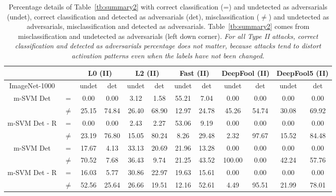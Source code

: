 \documentclass[10pt,twocolumn,letterpaper]{article}
\begin{document}
\begin{table*}[h]
\begin{center}
\resizebox{0.9\textwidth}{!}
{
\begin{tabular}{c | c |c c| c c|c c|c c| c c }
 & & \multicolumn{2}{c|}{L0 (II)} & \multicolumn{2}{c|}{L2 (II)} & \multicolumn{2}{c|}{Fast (II)} & \multicolumn{2}{c|}{DeepFool (II)} & \multicolumn{2}{c}{DeepFool5 (II)}\\
\hline
ImageNet-1000 & &   undet   &   det & undet   &   det  & undet   &   det  & undet   &   det  & undet & det\\
\hline
\hline

\multirow{2}{*}{m-SVM Det} & = &  0.00 &  0.00 & 3.12  &  1.58 & 55.21  &  7.04 &  0.00 &  0.00 &  0.00 &  0.00 \\
& $\not=$ &  25.15 &  74.84 & 26.40  &  68.90 &  12.97 & 24.78  &  45.26 & 54.74  & 30.08  &  69.92 \\
\hline
\multirow{2}{*}{m-SVM Det - R} &  = &  0.00  & 0.00  &  2.43 &  2.27 &  53.06 &  9.19 & 0.00  &  0.00 &  0.00 &  0.00 \\
& $\not=$ &  23.19  &  76.80 &  15.05 & 80.24  &  8.26 & 29.48  & 2.32  & 97.67  & 15.52  &  84.48 \\
\hline

\multirow{2}{*}{m-SVM Det} & = &  17.67  & 4.13  & 33.13  & 20.69  & 21.96  & 13.28  &  0.00 &  0.00 &  0.00 &  0.00 \\
& $\not=$ &  70.52  & 7.68  & 36.43  & 9.74  &  21.25 & 43.52  &  100.00 & 0.00  &  42.24 & 57.76  \\
\hline
\multirow{2}{*}{m-SVM Det - R} &  = &  16.03  &  5.77 &  30.86 &  22.97 &  19.63 & 15.61  & 0.00  & 0.00  & 0.00  &  0.00 \\
& $\not=$ &  52.56  & 25.64  & 26.66  & 19.51  &  12.16 & 52.61  &  4.49 &  95.51 &  21.99 & 78.01  \\

\end{tabular}
}
\caption{Percentage details of Table~\ref{tb:summary2} with correct classification (=) and undetected as adversarials (undet), correct classification and detected as adversarials (det), 
misclassification ($\not=$) and undetected as adversarials, misclassification and detected as adversarials. Table~\ref{tb:summary2} comes from misclassification and undetected as adversarials
(left down corner). \emph{For all Type II attacks, correct classification and detected as adversarials percentage
does not matter, because attacks tend to distort activation patterns even when the labels have not been changed.} }
\label{tb:attack2}
\end{center}
\end{table*}


{\small


}
\end{document}
